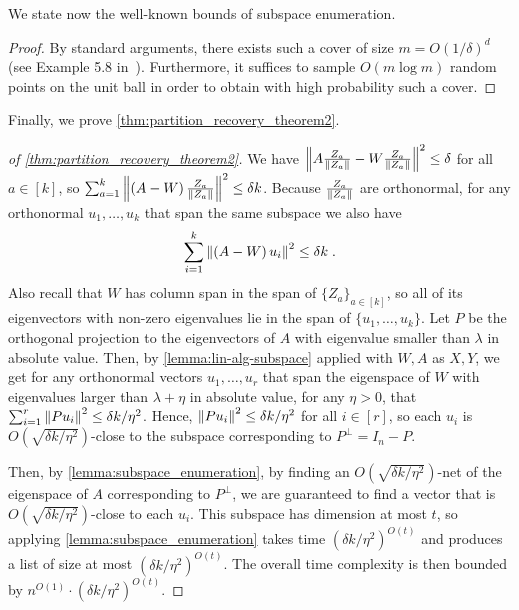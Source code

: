 We state now the well-known bounds of subspace enumeration.


\begin{proof}
    By standard arguments, there exists such a cover of size $m = O(1/\delta)^d$ (see Example 5.8 in~\cite{MR3967104-Wainwright19}).
    Furthermore, it suffices to sample $O(m \log m)$ random points on the unit ball in order to obtain with high probability such a cover.
\end{proof}

Finally, we prove \cref{thm:partition_recovery_theorem2}.

\begin{proof}[of \cref{thm:partition_recovery_theorem2}]
    We have $\left\lVert A \frac{Z_a}{\left\lVert Z_a\right\rVert} - W \frac{Z_a}{\left\lVert Z_a\right\rVert}\right\rVert^2 \leq \delta$ for all $a \in [k]$, so $\sum_{a=1}^k \left\lVert\left(A - W\right)\frac{Z_a}{\left\lVert Z_a\right\rVert}\right\rVert^2 \leq \delta k$.
    Because $\frac{Z_a}{\left\lVert Z_a\right\rVert}$ are orthonormal, for any orthonormal $u_1, \ldots, u_k$ that span the same subspace we also have \[\sum_{i=1}^k \left\lVert\left(A -W\right)u_i\right\rVert^2
    \leq \delta k\;.\]
    Also recall that $W$ has column span in the span of $\{Z_a\}_{a \in [k]}$, so all of its eigenvectors with non-zero eigenvalues lie in the span of $\{u_1, \ldots, u_k\}$.
    Let $P$ be the orthogonal projection to the eigenvectors of $A$ with eigenvalue smaller than $\lambda$ in absolute value.
    Then, by \cref{lemma:lin-alg-subspace} applied with $W, A$ as $X, Y$, we get for any orthonormal vectors $u_1, \ldots, u_r$ that span the eigenspace of $W$ with eigenvalues larger than $\lambda+\eta$ in absolute value, for any $\eta >0$, that $\sum_{i=1}^r \left\lVert P u_i\right\rVert^2 \leq \delta k / \eta^2$.
    Hence, $\left\lVert P u_i\right\rVert^2 \leq \delta k / \eta^2$ for all $i \in [r]$, so each $u_i$ is $O(\sqrt{\delta k / \eta^2})$-close to the subspace corresponding to $P^{\bot} = I_n - P$.

    Then, by \cref{lemma:subspace_enumeration}, by finding an $O(\sqrt{\delta k / \eta^2})$-net of the eigenspace of $A$ corresponding to $P^\bot$, we are guaranteed to find a vector that is $O(\sqrt{\delta k / \eta^2})$-close to each $u_i$.
    This subspace has dimension at most $t$, so applying \cref{lemma:subspace_enumeration} takes time $(\delta k/\eta^2)^{O(t)}$ and produces a list of size at most $(\delta k /\eta^2)^{O(t)}$.
    The overall time complexity is then bounded by $n^{O(1)} \cdot (\delta k/\eta^2)^{O(t)}$.
\end{proof}

